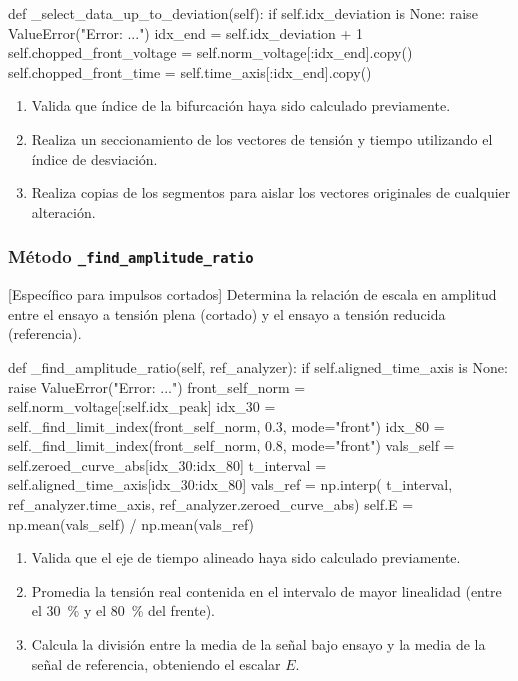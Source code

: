 \begin{python}
def _select_data_up_to_deviation(self):
    if self.idx_deviation is None:
        raise ValueError("Error: ...")
    idx_end = self.idx_deviation + 1
    self.chopped_front_voltage = self.norm_voltage[:idx_end].copy()
    self.chopped_front_time = self.time_axis[:idx_end].copy()
\end{python}

\begin{enumerate}
    \item Valida que índice de la bifurcación haya sido calculado previamente.
    \item Realiza un seccionamiento de los vectores de tensión y tiempo utilizando el índice de desviación.
    \item Realiza copias de los segmentos para aislar los vectores originales de cualquier alteración.
\end{enumerate}

\subsubsection{Método \texttt{\_find\_amplitude\_ratio}}
[Específico para impulsos cortados] Determina la relación de escala en amplitud entre el ensayo a tensión plena (cortado) y el ensayo a tensión reducida (referencia).

\begin{python}
    def _find_amplitude_ratio(self, ref_analyzer):
        if self.aligned_time_axis is None:
            raise ValueError("Error: ...")
        front_self_norm = self.norm_voltage[:self.idx_peak]
        idx_30 = self._find_limit_index(front_self_norm, 0.3, mode="front")
        idx_80 = self._find_limit_index(front_self_norm, 0.8, mode="front")
        vals_self = self.zeroed_curve_abs[idx_30:idx_80]
        t_interval = self.aligned_time_axis[idx_30:idx_80]
        vals_ref = np.interp(
            t_interval,
            ref_analyzer.time_axis,
            ref_analyzer.zeroed_curve_abs)
        self.E = np.mean(vals_self) / np.mean(vals_ref)
\end{python}

\begin{enumerate}
    \item Valida que el eje de tiempo alineado haya sido calculado previamente.
    \item Promedia la tensión real contenida en el intervalo de mayor linealidad (entre el \SI{30}{\percent} y el \SI{80}{\percent} del frente).
    \item Calcula la división entre la media de la señal bajo ensayo y la media de la señal de referencia, obteniendo el escalar $E$.
\end{enumerate}

